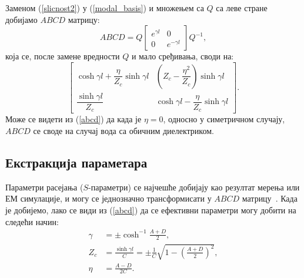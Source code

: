 Заменом (\ref{slicnost2}) у (\ref{modal_basis}) и множењем са $Q$ са леве стране добијамо $ABCD$ матрицу:
\begin{equation}\label{decomp}
ABCD = Q\begin{bmatrix} e^{\gamma l} & 0 \\ 0 & e^{-\gamma l} \end{bmatrix}Q^{-1},
\end{equation}
која се, после замене вредности $Q$ и мало сређивања, своди на:
\begin{equation}\label{abcd}
\begin{bmatrix}
\cosh{\gamma l} + \dfrac{\eta}{Z_c}\sinh{\gamma l } & \left( Z_c - \dfrac{\eta^2}{Z_c} \right) \sinh{\gamma l} \\
\dfrac{\sinh{\gamma l}}{Z_c} & \cosh{\gamma l} - \dfrac{\eta}{Z_c}\sinh{\gamma l }
\end{bmatrix}.
\end{equation}
Може се видети из (\ref{abcd}) да када је $\eta = 0$, односно у симетричном случају, $ABCD$ се своде на случај вода са обичним диелектриком.

\subsection{Екстракција параметара}
Параметри расејања ($S$-параметри) се најчешће добијају као резултат мерења или ЕМ симулације, и могу се једнозначно трансформисати у $ABCD$ матрицу~\cite{Pozar:05}. Када је добијемо, лако се види из (\ref{abcd}) да се ефективни параметри могу добити на следећи начин:
\begin{align}
\gamma & = \pm \cosh^{-1}\frac{A+D}{2},\label{a2gama}\\
Z_c & = \frac{\sinh{\gamma l}}{C} = \pm\frac{1}{C}\sqrt{1 - \left( \frac{A+D}{2}\right)^2},\label{a2zc}\\
\eta & = \frac{A-D}{2C}.\label{a2eta}
\end{align}

